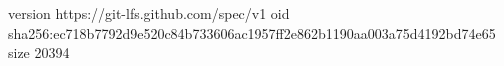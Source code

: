 version https://git-lfs.github.com/spec/v1
oid sha256:ec718b7792d9e520c84b733606ac1957ff2e862b1190aa003a75d4192bd74e65
size 20394
